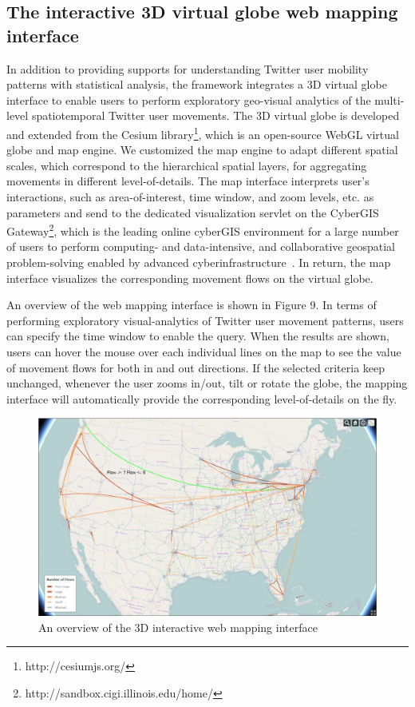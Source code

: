\documentclass[a4paper, 11pt]{article}
\begin{document}
\subsection{The interactive 3D virtual globe web mapping interface}
In addition to providing supports for understanding Twitter user mobility patterns with statistical analysis, the framework integrates a 3D virtual globe interface to enable users to perform exploratory geo-visual analytics of the multi-level spatiotemporal Twitter user movements. 
The 3D virtual globe is developed and extended from the Cesium library\footnote{http://cesiumjs.org/}, which is an open-source WebGL virtual globe and map engine. 
We customized the map engine to adapt different spatial scales, which correspond to the hierarchical spatial layers,  for aggregating movements in different level-of-details.
The map interface interprets user's interactions, such as area-of-interest, time window, and zoom levels, etc. as parameters and send to the dedicated visualization servlet on the CyberGIS Gateway\footnote{http://sandbox.cigi.illinois.edu/home/}, which is the leading online cyberGIS environment for a large number of users to perform computing- and data-intensive, and collaborative geospatial problem-solving enabled by advanced cyberinfrastructure~\citep{liu2014cybergis}.
In return, the map interface visualizes the corresponding movement flows on the virtual globe.

An overview of the web mapping interface is shown in Figure 9. In terms of performing exploratory visual-analytics of Twitter user movement patterns, users can specify the time window to enable the query. 
When the results are shown, users can hover the mouse over each individual lines on the map to see the value of movement flows for both in and out directions. If the selected criteria keep unchanged, whenever the user zooms in/out, tilt or rotate the globe, the mapping interface will automatically provide the corresponding level-of-details on the fly.

\begin{figure}[h]
\centering
\includegraphics[width=0.8\linewidth]{./figures/vocation}
\caption{An overview of the 3D interactive web mapping interface}
\label{fig:Web_Interface}
\end{figure}
\end{document}
